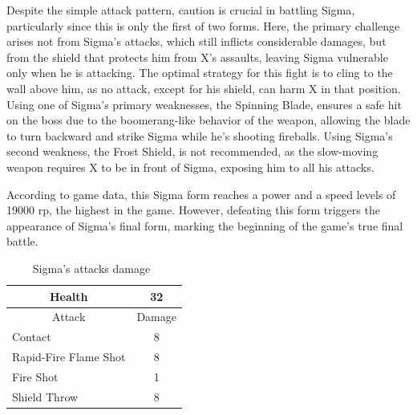 Despite the simple attack pattern, caution is crucial in battling Sigma, particularly since this is only the first of two forms. Here, the primary challenge arises not from Sigma's attacks, which still inflicts considerable damages, but from the shield that protects him from X's assaults, leaving Sigma vulnerable only when he is attacking. The optimal strategy for this fight is to cling to the wall above him, as no attack, except for his shield, can harm X in that position. Using one of Sigma's primary weaknesses, the Spinning Blade, ensures a safe hit on the boss due to the boomerang-like behavior of the weapon, allowing the blade to turn backward and strike Sigma while he's shooting fireballs. Using Sigma's second weakness, the Frost Shield, is not recommended, as the slow-moving weapon requires X to be in front of Sigma, exposing him to all his attacks.

According to game data, this Sigma form reaches a power and a speed levels of 19000 rp, the highest in the game. However, defeating this form triggers the appearance of Sigma's final form, marking the beginning of the game's true final battle.
\begin{table}[htp]
	\centering
	\begin{tabular}[h]{l c}
		\toprule
		\multicolumn{1}{c}{Health}  & 32 \\
		\midrule
		\multicolumn{1}{c}{Attack} & \multicolumn{1}{c}{Damage}\\
		Contact & 8 \\
		Rapid-Fire Flame Shot& 8\\
		Fire Shot & 1\\
		Shield Throw& 8\\ 
		\bottomrule
	\end{tabular}
	\caption{Sigma's attacks damage~\cite{wiki:Sigma3,book:Compendium}}
\end{table}

